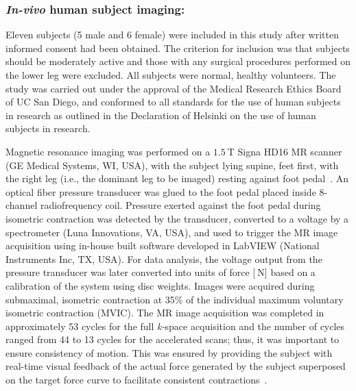 \subsubsection{\textit{In-vivo} human subject imaging: }
Eleven subjects (5 male and 6 female) were included in this study after written informed consent had been obtained. 
The criterion for inclusion was that subjects should be moderately active and those with any surgical procedures performed on the lower leg were excluded. 
All subjects were normal, healthy volunteers. 
The study was carried out under the approval of the Medical Research Ethics Board of UC San Diego, and conformed to all standards for the use of human subjects in research as outlined in the Declaration of Helsinki on the use of human subjects in research.

Magnetic resonance imaging was performed on a $\SI{1.5}{\tesla}$ Signa HD16 MR scanner (GE Medical Systems, WI, USA), with the subject lying supine, feet first, with the right leg (i.e., the dominant leg to be imaged) resting against foot pedal~\cite{RNSS10}. 
An optical fiber pressure transducer was glued to the foot pedal placed inside 8-channel radiofrequency coil. 
Pressure exerted against the foot pedal during isometric contraction was detected by the transducer, converted to a voltage by a spectrometer (Luna Innovations, VA, USA), and used to trigger the MR image acquisition using in-house built software developed in LabVIEW (National Instruments Inc, TX, USA). 
For data analysis, the voltage output from the pressure transducer was later converted into units of force [$\SI{}{\newton}$] based on a calibration of the system using disc weights. 
Images were acquired during submaximal, isometric contraction at 35\% of the individual maximum voluntary isometric contraction (MVIC). 
The MR image acquisition was completed in approximately 53 cycles for the full \mbox{\textit{k-}space} acquisition and the number of cycles ranged from 44 to 13 cycles for the accelerated scans; thus, it was important to ensure consistency of motion. 
This was ensured by providing the subject with real-time visual feedback of the actual force generated by the subject superposed on the target force curve to facilitate consistent contractions~\cite{Malis:2018fr}.
